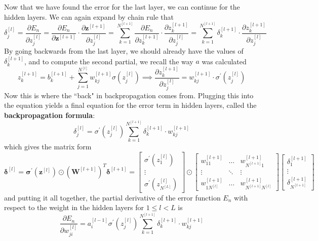 \documentclass{article}
\begin{document}
\begin{algo}[Backpropagation]
    Now that we have found the error for the last layer, we can continue for the hidden layers. We can again expand by chain rule that 
    \begin{equation} 
      \delta_j^{[l]} = \frac{\partial E_n}{\partial z_j^{[l]}} = \frac{\partial E_n}{\partial \mathbf{z}^{[l+1]}} \cdot \frac{\partial \mathbf{z}^{[l+1]}}{\partial z_j^{[l]}} = \sum_{k=1}^{N^{[l+1]}} \frac{\partial E_n}{\partial z_k^{[l+1]}} \cdot \frac{\partial z_k^{[l+1]}}{\partial z_j^{[l]}} = \sum_{k=1}^{N^{[l+1]}} \delta_k^{[l+1]} \cdot \frac{\partial z_k^{[l+1]}}{\partial z_j^{[l]}}
    \end{equation} 
    By going backwards from the last layer, we should already have the values of $\delta_k^{[l+1]}$, and to compute the second partial, we recall the way $a$ was calculated 
    \begin{equation}
      z_k^{[l+1]} = b_k^{[l+1]} + \sum_{j=1}^{N^{[l]}} w_{kj}^{[l+1]} \sigma(z_j^{[l]}) \implies \frac{\partial z_k^{[l+1]}}{\partial z_j^{[l]}} = w_{kj}^{[l+1]} \cdot \sigma^\prime(z_j^{[l]})
    \end{equation}
    Now this is where the ``back" in backpropagation comes from. Plugging this into the equation yields a final equation for the error term in hidden layers, called the \textbf{backpropagation formula}: 
    \begin{equation}
      \delta_j^{[l]} = \sigma^\prime(z_j^{[l]}) \sum_{k=1}^{N^{[l+1]}} \delta_k^{[l+1]} \cdot w_{kj}^{[l+1]}
    \end{equation}
    which gives the matrix form 
    \begin{equation}
      \boldsymbol{\delta}^{[l]} = \boldsymbol{\sigma}^\prime (\mathbf{z}^{[l]}) \odot (\mathbf{W}^{[l+1]})^T \boldsymbol{\delta}^{[l+1]} = \begin{bmatrix} \sigma^\prime (z_1^{[l]}) \\ \vdots \\ \sigma^\prime (z_{N^{[L]}}^{[l]})\end{bmatrix} \odot \begin{bmatrix} w_{11}^{[l+1]} & \ldots & w^{[l+1]}_{N^{[l+1]} 1} \\ \vdots & \ddots & \vdots \\ w^{[l+1]}_{1 N^{[l]}} & \ldots & w^{[l+1]}_{N^{[l+1]} N^{[l]}} \end{bmatrix} \begin{bmatrix} \delta_1^{[l+1]} \\ \vdots \\ \delta_{N^{[l+1]}}^{[l+1]} \end{bmatrix} 
    \end{equation}
    and putting it all together, the partial derivative of the error function $E_n$ with respect to the weight in the hidden layers for $1 \leq l < L$ is 
    \begin{equation}
      \frac{\partial E_n}{\partial w_{ji}^{[l]}} = a_i^{[l-1]} \sigma^\prime(z_j^{[l]}) \sum_{k=1}^{N^{[l+1]}} \delta_k^{[l+1]} \cdot w_{kj}^{[l+1]} 
    \end{equation}
  \end{algo}
\end{document}
